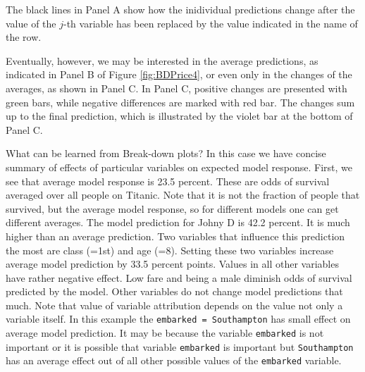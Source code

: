 \documentclass[12pt,]{krantz}
\begin{document}
The black lines in Panel A show how the inidividual predictions change after the value of the \(j\)-th variable has been replaced by the value indicated in the name of the row.

Eventually, however, we may be interested in the average predictions, as indicated in Panel B of Figure \ref{fig:BDPrice4}, or even only in the changes of the averages, as shown in Panel C. In Panel C, positive changes are presented with green bars, while negative differences are marked with red bar. The changes sum up to the final prediction, which is illustrated by the violet bar at the bottom of Panel C.

What can be learned from Break-down plots? In this case we have concise summary of effects of particular variables on expected model response.
First, we see that average model response is 23.5 percent. These are odds of survival averaged over all people on Titanic. Note that it is not the fraction of people that survived, but the average model response, so for different models one can get different averages.
The model prediction for Johny D is 42.2 percent. It is much higher than an average prediction. Two variables that influence this prediction the most are class (=1st) and age (=8). Setting these two variables increase average model prediction by 33.5 percent points. Values in all other variables have rather negative effect. Low fare and being a male diminish odds of survival predicted by the model. Other variables do not change model predictions that much.
Note that value of variable attribution depends on the value not only a variable itself. In this example the \texttt{embarked\ =\ Southampton} has small effect on average model prediction. It may be because the variable \texttt{embarked} is not important or it is possible that variable \texttt{embarked} is important but \texttt{Southampton} has an average effect out of all other possible values of the \texttt{embarked} variable.
\end{document}

